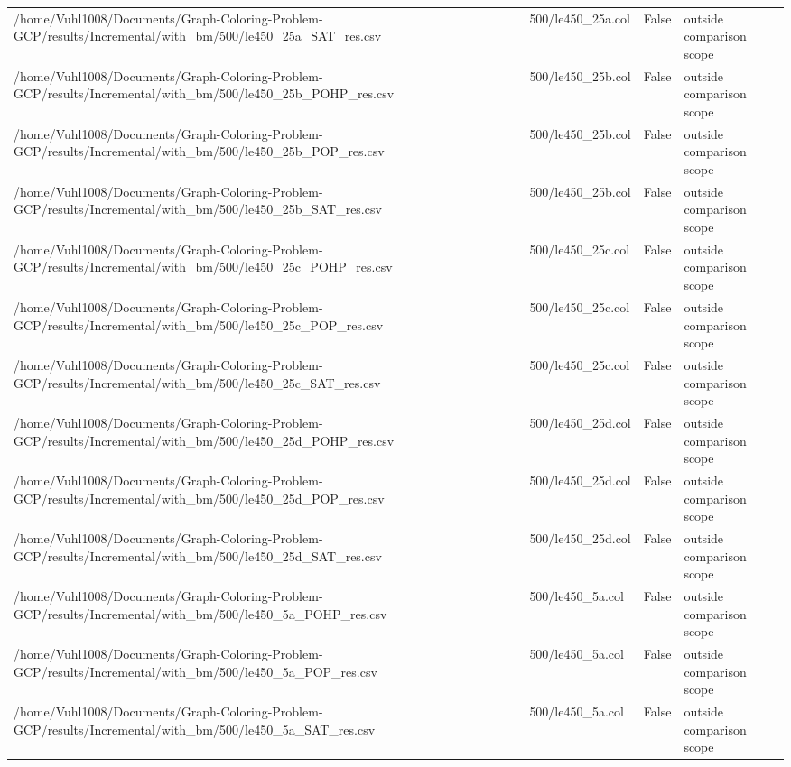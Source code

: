 \begin{table}[htbp]
\begin{tabular}{llll}
/home/Vuhl1008/Documents/Graph-Coloring-Problem-GCP/results/Incremental/with\_bm/500/le450\_25a\_SAT\_res.csv & 500/le450\_25a.col & False & outside comparison scope \\
/home/Vuhl1008/Documents/Graph-Coloring-Problem-GCP/results/Incremental/with\_bm/500/le450\_25b\_POHP\_res.csv & 500/le450\_25b.col & False & outside comparison scope \\
/home/Vuhl1008/Documents/Graph-Coloring-Problem-GCP/results/Incremental/with\_bm/500/le450\_25b\_POP\_res.csv & 500/le450\_25b.col & False & outside comparison scope \\
/home/Vuhl1008/Documents/Graph-Coloring-Problem-GCP/results/Incremental/with\_bm/500/le450\_25b\_SAT\_res.csv & 500/le450\_25b.col & False & outside comparison scope \\
/home/Vuhl1008/Documents/Graph-Coloring-Problem-GCP/results/Incremental/with\_bm/500/le450\_25c\_POHP\_res.csv & 500/le450\_25c.col & False & outside comparison scope \\
/home/Vuhl1008/Documents/Graph-Coloring-Problem-GCP/results/Incremental/with\_bm/500/le450\_25c\_POP\_res.csv & 500/le450\_25c.col & False & outside comparison scope \\
/home/Vuhl1008/Documents/Graph-Coloring-Problem-GCP/results/Incremental/with\_bm/500/le450\_25c\_SAT\_res.csv & 500/le450\_25c.col & False & outside comparison scope \\
/home/Vuhl1008/Documents/Graph-Coloring-Problem-GCP/results/Incremental/with\_bm/500/le450\_25d\_POHP\_res.csv & 500/le450\_25d.col & False & outside comparison scope \\
/home/Vuhl1008/Documents/Graph-Coloring-Problem-GCP/results/Incremental/with\_bm/500/le450\_25d\_POP\_res.csv & 500/le450\_25d.col & False & outside comparison scope \\
/home/Vuhl1008/Documents/Graph-Coloring-Problem-GCP/results/Incremental/with\_bm/500/le450\_25d\_SAT\_res.csv & 500/le450\_25d.col & False & outside comparison scope \\
/home/Vuhl1008/Documents/Graph-Coloring-Problem-GCP/results/Incremental/with\_bm/500/le450\_5a\_POHP\_res.csv & 500/le450\_5a.col & False & outside comparison scope \\
/home/Vuhl1008/Documents/Graph-Coloring-Problem-GCP/results/Incremental/with\_bm/500/le450\_5a\_POP\_res.csv & 500/le450\_5a.col & False & outside comparison scope \\
/home/Vuhl1008/Documents/Graph-Coloring-Problem-GCP/results/Incremental/with\_bm/500/le450\_5a\_SAT\_res.csv & 500/le450\_5a.col & False & outside comparison scope \\

\end{tabular}
\end{table}
